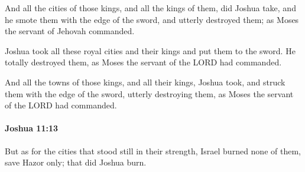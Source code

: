 			\begin{versebox}
					\item[BHS] 
					\item[ASV] And all the cities of those kings, and all the kings of them, did Joshua take, and he smote them with the edge of the sword, and utterly destroyed them; as Moses the servant of Jehovah commanded.
					\item[NIV] Joshua took all these royal cities and their kings and put them to the sword. He totally destroyed them, as Moses the servant of the LORD had commanded.
					\item[NRSV] And all the towns of those kings, and all their kings, Joshua took, and struck them with the edge of the sword, utterly destroying them, as Moses the servant of the LORD had commanded.
			\end{versebox}

		\paragraph{Joshua 11:13} %
			\label{JOSHUA-11-13}

			But as for the cities that stood still in their strength, Israel burned none of them, save Hazor only; that did Joshua burn.

